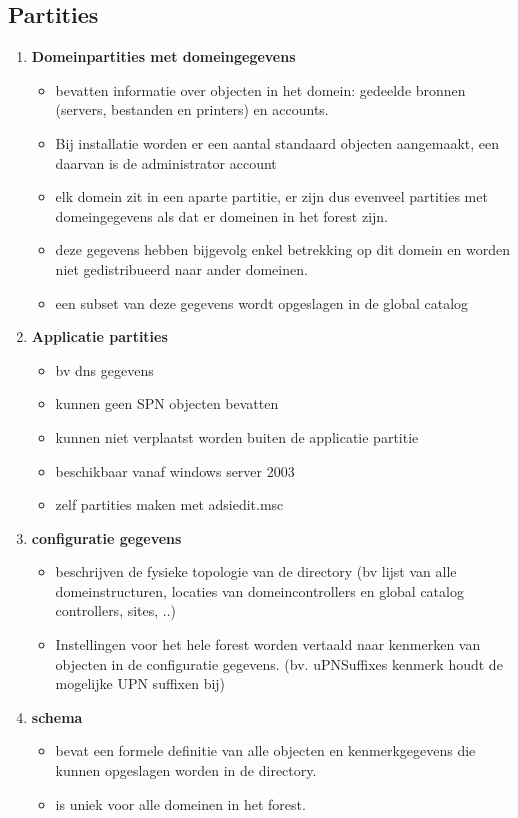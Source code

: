 \subsection{Partities}
\begin{enumerate}
\item \textbf{Domeinpartities met domeingegevens}
\begin{itemize}
\item bevatten informatie over objecten in het domein: gedeelde bronnen (servers, bestanden en printers) en accounts.
\item Bij installatie worden er een aantal standaard objecten aangemaakt, een daarvan is de administrator account
\item elk domein zit in een aparte partitie, er zijn dus evenveel partities met domeingegevens als dat er domeinen in het forest zijn.
\item deze gegevens hebben bijgevolg enkel betrekking op dit domein en worden niet gedistribueerd naar ander domeinen.
\item een subset van deze gegevens wordt opgeslagen in de global catalog
\end{itemize}

\item \textbf{Applicatie partities}
\begin{itemize}
\item bv dns gegevens
\item kunnen geen SPN objecten bevatten
\item kunnen niet verplaatst worden buiten de applicatie partitie
\item beschikbaar vanaf windows server 2003
\item zelf partities maken met adsiedit.msc
\end{itemize}

\clearpage

\item \textbf{configuratie gegevens}
\begin{itemize}
\item beschrijven de fysieke topologie van de directory (bv lijst van alle domeinstructuren, locaties van domeincontrollers en global catalog controllers, sites, ..)
\item Instellingen voor het hele forest worden vertaald naar kenmerken van objecten in de configuratie gegevens. (bv. uPNSuffixes kenmerk houdt de mogelijke UPN suffixen bij)
\end{itemize}

\item \textbf{schema}
\begin{itemize}
\item bevat een formele definitie van alle objecten en kenmerkgegevens die kunnen opgeslagen worden in de directory.
\item is uniek voor alle domeinen in het forest.
\end{itemize}
\end{enumerate}

